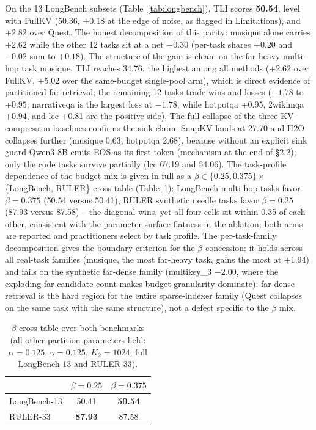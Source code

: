 \documentclass[11pt]{article}
\begin{document}
On the 13 LongBench subsets (Table~\ref{tab:longbench}), TLI scores \textbf{50.54}, level with FullKV (50.36, $+0.18$ at the edge of noise, as flagged in Limitations), and $+2.82$ over Quest. The honest decomposition of this parity: musique alone carries $+2.62$ while the other 12 tasks sit at a net $-0.30$ (per-task shares $+0.20$ and $-0.02$ sum to $+0.18$). The structure of the gain is clean: on the far-heavy multi-hop task musique, TLI reaches 34.76, the highest among all methods (+2.62 over FullKV, +5.02 over the same-budget single-pool arm), which is direct evidence of partitioned far retrieval; the remaining 12 tasks trade wins and losses ($-1.78$ to $+0.95$; narrativeqa is the largest loss at $-1.78$, while hotpotqa +0.95, 2wikimqa +0.94, and lcc +0.81 are the positive side). The full collapse of the three KV-compression baselines confirms the sink claim: SnapKV lands at 27.70 and H2O collapses further (musique 0.63, hotpotqa 2.68), because without an explicit sink guard Qwen3-8B emits EOS as its first token (mechanism at the end of \S2.2); only the code tasks survive partially (lcc 67.19 and 54.06). The task-profile dependence of the budget mix is given in full as a $\beta \in \{0.25, 0.375\} \times$ \{LongBench, RULER\} cross table (Table~\ref{tab:betacross}): LongBench multi-hop tasks favor $\beta{=}0.375$ (50.54 versus 50.41), RULER synthetic needle tasks favor $\beta{=}0.25$ (87.93 versus 87.58) -- the diagonal wins, yet all four cells sit within 0.35 of each other, consistent with the parameter-surface flatness in the ablation; both arms are reported and practitioners select by task profile. The per-task-family decomposition gives the boundary criterion for the $\beta$ concession: it holds across all real-task families (musique, the most far-heavy task, gains the most at +1.94) and fails on the synthetic far-dense family (multikey\_3 $-2.00$, where the exploding far-candidate count makes budget granularity dominate): far-dense retrieval is the hard region for the entire sparse-indexer family (Quest collapses on the same task with the same structure), not a defect specific to the $\beta$ mix.

\begin{table}[h]\centering
\caption{$\beta$ cross table over both benchmarks (all other partition parameters held: $\alpha{=}0.125$, $\gamma{=}0.125$, $K_2{=}1024$; full LongBench-13 and RULER-33).}
\label{tab:betacross}
\begin{tabular}{lcc}
\toprule
 & $\beta{=}0.25$ & $\beta{=}0.375$ \\
\midrule
LongBench-13 & 50.41 & \textbf{50.54} \\
RULER-33 & \textbf{87.93} & 87.58 \\
\bottomrule
\end{tabular}
\end{table}
\end{document}
